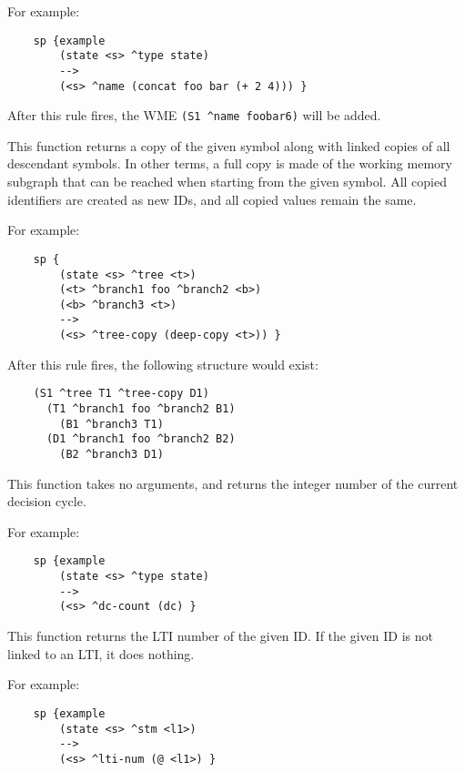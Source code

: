 \begin{description}
	For example:

	\begin{verbatim}
	sp {example
	    (state <s> ^type state)
	    -->
	    (<s> ^name (concat foo bar (+ 2 4))) }
	\end{verbatim}

	After this rule fires, the WME \verb=(S1 ^name foobar6)= will be added.


\item [\soarb{deep-copy} --- ]
	This function returns a copy of the given symbol along with linked copies of all descendant symbols. In other terms, a full copy is made of the working memory subgraph that can be reached when starting from the given symbol. All copied identifiers are created as new IDs, and all copied values remain the same.

	For example:

	\begin{verbatim}
	sp {
	    (state <s> ^tree <t>)
	    (<t> ^branch1 foo ^branch2 <b>)
	    (<b> ^branch3 <t>)
	    -->
	    (<s> ^tree-copy (deep-copy <t>)) }
	\end{verbatim}

	After this rule fires, the following structure would exist:

	\begin{verbatim}
	(S1 ^tree T1 ^tree-copy D1)
	  (T1 ^branch1 foo ^branch2 B1)
	    (B1 ^branch3 T1)
	  (D1 ^branch1 foo ^branch2 B2)
	    (B2 ^branch3 D1)
	\end{verbatim}


\item [\soarb{dc} --- ]
	This function takes no arguments, and returns the integer number of the current decision cycle.

	For example:

	\begin{verbatim}
	sp {example
	    (state <s> ^type state)
	    -->
	    (<s> ^dc-count (dc) }
	\end{verbatim}


\item [\soarb{@ (get)} --- ]
	This function returns the LTI number of the given ID. If the given ID is not linked to an LTI, it does nothing.

	For example:

	\begin{verbatim}
	sp {example
	    (state <s> ^stm <l1>)
	    -->
	    (<s> ^lti-num (@ <l1>) }
	\end{verbatim}


\end{description}
